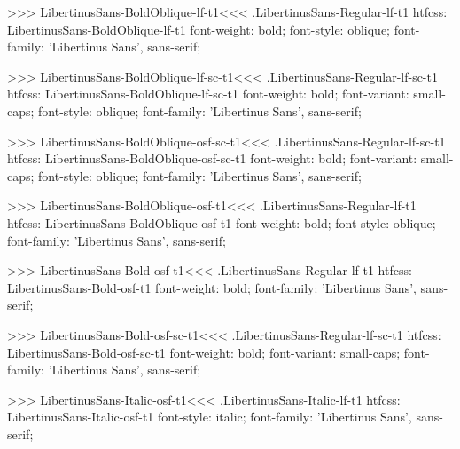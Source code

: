 {{{{>>>
\<LibertinusSans-BoldOblique-lf-t1\><<<
.LibertinusSans-Regular-lf-t1
htfcss:  LibertinusSans-BoldOblique-lf-t1  font-weight: bold; font-style: oblique; font-family: 'Libertinus Sans', sans-serif;

>>>
\<LibertinusSans-BoldOblique-lf-sc-t1\><<<
.LibertinusSans-Regular-lf-sc-t1
htfcss:  LibertinusSans-BoldOblique-lf-sc-t1  font-weight: bold; font-variant: small-caps; font-style: oblique; font-family: 'Libertinus Sans', sans-serif;

>>>
\<LibertinusSans-BoldOblique-osf-sc-t1\><<<
.LibertinusSans-Regular-lf-sc-t1
htfcss:  LibertinusSans-BoldOblique-osf-sc-t1  font-weight: bold; font-variant: small-caps; font-style: oblique; font-family: 'Libertinus Sans', sans-serif;

>>>
\<LibertinusSans-BoldOblique-osf-t1\><<<
.LibertinusSans-Regular-lf-t1
htfcss:  LibertinusSans-BoldOblique-osf-t1  font-weight: bold; font-style: oblique; font-family: 'Libertinus Sans', sans-serif;

>>>
\<LibertinusSans-Bold-osf-t1\><<<
.LibertinusSans-Regular-lf-t1
htfcss:  LibertinusSans-Bold-osf-t1  font-weight: bold; font-family: 'Libertinus Sans', sans-serif;

>>>
\<LibertinusSans-Bold-osf-sc-t1\><<<
.LibertinusSans-Regular-lf-sc-t1
htfcss:  LibertinusSans-Bold-osf-sc-t1  font-weight: bold; font-variant: small-caps; font-family: 'Libertinus Sans', sans-serif;

>>>
\<LibertinusSans-Italic-osf-t1\><<<
.LibertinusSans-Italic-lf-t1
htfcss:  LibertinusSans-Italic-osf-t1  font-style: italic; font-family: 'Libertinus Sans', sans-serif;

}}}}
